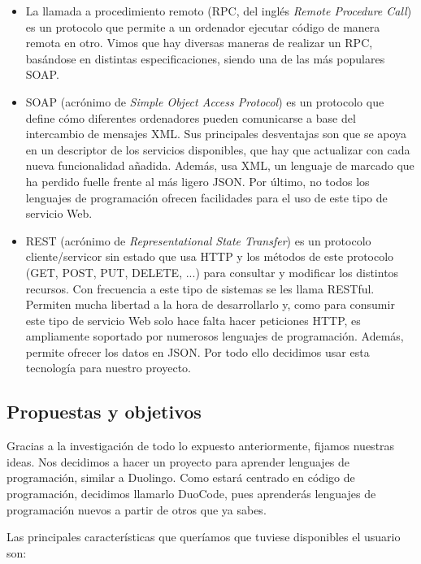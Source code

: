 \begin{itemize}
\item
La llamada a procedimiento remoto (RPC, del inglés \emph{Remote Procedure Call}) es un protocolo que permite a un ordenador ejecutar código de manera remota en otro. Vimos que hay diversas maneras de realizar un RPC, basándose en distintas especificaciones, siendo una de las más populares SOAP.

\item
SOAP (acrónimo de \emph{Simple Object Access Protocol}) es un protocolo que define cómo diferentes ordenadores pueden comunicarse a base del intercambio de mensajes XML. Sus principales desventajas son que se apoya en un descriptor de los servicios disponibles, que hay que actualizar con cada nueva funcionalidad añadida. Además, usa XML, un lenguaje de marcado que ha perdido fuelle frente al más ligero JSON. Por último, no todos los lenguajes de programación ofrecen facilidades para el uso de este tipo de servicio Web.

\item
REST (acrónimo de \emph{Representational State Transfer}) es un protocolo cliente/servicor sin estado que usa HTTP y los métodos de este protocolo (GET, POST, PUT, DELETE, ...) para consultar y modificar los distintos recursos. Con frecuencia a este tipo de sistemas se les llama RESTful. Permiten mucha libertad a la hora de desarrollarlo y, como para consumir este tipo de servicio Web solo hace falta hacer peticiones HTTP, es ampliamente soportado por numerosos lenguajes de programación. Además, permite ofrecer los datos en JSON. Por todo ello decidimos usar esta tecnología para nuestro proyecto.

\end{itemize}

\subsection{Propuestas y objetivos\label{subsec:objetivos}}

Gracias a la investigación de todo lo expuesto anteriormente, fijamos nuestras ideas. Nos decidimos a hacer un proyecto para aprender lenguajes de programación, similar a Duolingo. Como estará centrado en código de programación, decidimos llamarlo DuoCode, pues aprenderás lenguajes de programación nuevos a partir de otros que ya sabes. 

Las principales características que queríamos que tuviese disponibles el usuario son:

